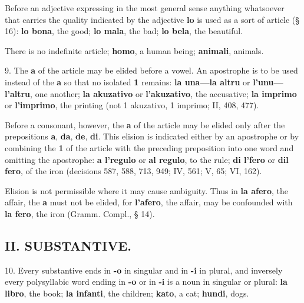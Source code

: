 Before an adjective expressing in the most general sense anything whatsoever that carries the quality indicated by the adjective \textbf{lo} is used as a sort of article (§ 16): \textbf{lo bona}, the good; \textbf{lo mala}, the bad; \textbf{lo bela}, the beautiful. 

There is no indefinite article; \textbf{homo}, a human being; \textbf{animali}, animals. 

9. The \textbf{a} of the article may be elided before a vowel. An apostrophe is to be used instead of the \textbf{a} so that no isolated \textbf{1} remains: \textbf{la una—la altru} or \textbf{l'unu—l'altru}, one another; \textbf{la akuzativo} or \textbf{l'akuzativo}, the accusative; \textbf{la imprimo} or \textbf{l'imprimo}, the printing (not 1 akuzativo, 1 imprimo; II, 408, 477). 

Before a consonant, however, the \textbf{a} of the article may be elided only after the prepositions \textbf{a}, \textbf{da}, \textbf{de}, \textbf{di}. This elision is indicated either by an apostrophe or by combining the \textbf{1} of the article with the preceding preposition into one word and omitting the apostrophe: \textbf{a l'regulo} or \textbf{al regulo}, to the rule; \textbf{di l'fero} or \textbf{dil fero}, of the iron (decisions 587, 588, 713, 949; IV, 561; V, 65; VI, 162). 

Elision is not permissible where it may cause ambiguity. Thus in \textbf{la afero}, the affair, the \textbf{a} must not be elided, for \textbf{l'afero}, the affair, may be confounded with \textbf{la fero}, the iron (Gramm. Compl., § 14).

\subsection*{II. SUBSTANTIVE.}
10. Every substantive ends in \textbf{-o} in singular and in \textbf{-i} in plural, and inversely every polysyllabic word ending in \textbf{-o} or in \textbf{-i} is a noun in singular or plural: \textbf{la libro}, the book; \textbf{la infanti}, the children; \textbf{kato}, a cat; \textbf{hundi}, dogs.\footnotemark[1]

